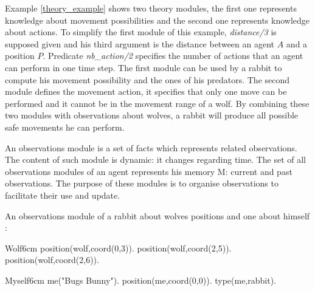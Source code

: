 \documentclass{aamas2012}
\begin{document}
	Example \ref{theory_example} shows two theory modules, the first one represents knowledge about movement possibilities
	and the second one represents knowledge about actions.
	To simplify the first module of this example, \emph{distance/3} is supposed given and 
	his third argument is the distance between an agent $A$ and a position $P$.
	Predicate \emph{nb\_action/2} specifies the number of actions that an agent can perform in one time step.
	The first module can be used by a rabbit to compute his movement possibility and the ones of his predators.
	The second module defines the movement action, it specifies that only one move can be performed and it cannot be in the movement range of a wolf.
	By combining these two modules with observations about wolves, a rabbit will produce all possible safe movements he can perform.

	\begin{definition}
		An observations module is a set of facts which represents related observations.
		The content of such module is dynamic: it changes regarding time.
		The set of all observations modules of an agent represents his memory M: current and past observations.
		The purpose of these modules is to organise observations to facilitate their use and update.
	\end{definition}
	
	\begin{example}
		An observations module of a rabbit about wolves positions and one about himself :\newline
		\begin{module}{Wolf}{6cm}
			position(wolf,coord(0,3)).\newline
			position(wolf,coord(2,5)).\newline
			position(wolf,coord(2,6)).
		\end{module}
		
		\begin{module}{Myself}{6cm}
			me("Bugs Bunny").\newline
			position(me,coord(0,0)).\newline
			type(me,rabbit).
		\end{module}
	\end{example}
\end{document}
